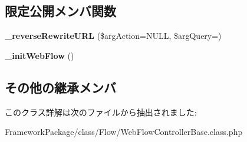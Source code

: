 \subsection*{限定公開メンバ関数}
\begin{DoxyCompactItemize}
\item 
\hypertarget{class_web_flow_controller_base_ab9f557b84cee49999a493996431c3087}{}{\bfseries \+\_\+reverse\+Rewrite\+U\+R\+L} (\$arg\+Action=N\+U\+L\+L, \$arg\+Query=\textquotesingle{}\textquotesingle{})\label{class_web_flow_controller_base_ab9f557b84cee49999a493996431c3087}

\item 
\hypertarget{class_web_flow_controller_base_ac502f82273a95f57d7ddb0311533b1ac}{}{\bfseries \+\_\+init\+Web\+Flow} ()\label{class_web_flow_controller_base_ac502f82273a95f57d7ddb0311533b1ac}

\end{DoxyCompactItemize}
\subsection*{その他の継承メンバ}


このクラス詳解は次のファイルから抽出されました\+:\begin{DoxyCompactItemize}
\item 
Framework\+Package/class/\+Flow/Web\+Flow\+Controller\+Base.\+class.\+php\end{DoxyCompactItemize}
